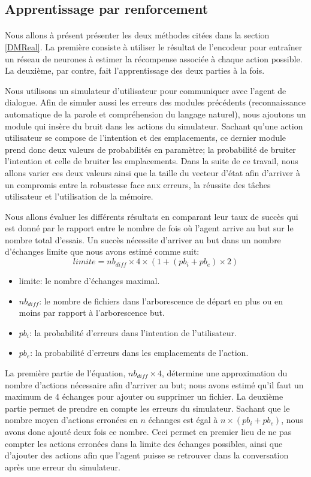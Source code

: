 \subsection{Apprentissage par renforcement}
\paragraph{}Nous allons à présent présenter les deux méthodes citées dans la section \ref{DMReal}. La première consiste à utiliser le résultat de l'encodeur pour entraîner un réseau de neurones à estimer la récompense associée à chaque action possible. La deuxième, par contre, fait l'apprentissage des deux parties à la fois.
\par Nous utilisons un simulateur d'utilisateur pour communiquer avec l'agent de dialogue. Afin de simuler aussi les erreurs des modules précédents (reconnaissance automatique de la parole et compréhension du langage naturel), nous ajoutons un module qui insère du bruit dans les actions du simulateur. Sachant qu'une action utilisateur se compose de l'intention et des emplacements, ce dernier module prend donc deux valeurs de probabilités en paramètre; la probabilité de bruiter l'intention et celle de bruiter les emplacements. Dans la suite de ce travail, nous allons varier ces deux valeurs ainsi que la taille du vecteur d'état afin d'arriver à un compromis entre la robustesse face aux erreurs, la réussite des tâches utilisateur et l'utilisation de la mémoire.
\par Nous allons évaluer les différents résultats en comparant leur taux de succès qui est donné par le rapport entre le nombre de fois où l'agent arrive au but sur le nombre total d'essais. Un succès nécessite d'arriver au but dans un nombre d'échanges limite que nous avons estimé comme suit: 
\[limite = nb_{diff} \times 4 \times (1 + (pb_i + pb_e) \times 2) \]
\begin{itemize}
	\item limite: le nombre d'échanges maximal.
	\item $nb_{diff}$: le nombre de fichiers dans l'arborescence de départ en plus ou en moins par rapport à l'arborescence but.
	\item $pb_i$: la probabilité d'erreurs dans l'intention de l'utilisateur.
	\item $pb_e$: la probabilité d'erreurs dans les emplacements de l'action.
\end{itemize}
\par La première partie de l'équation, $nb_{diff} \times 4$, détermine une approximation du nombre d'actions nécessaire afin d'arriver au but; nous avons estimé qu'il faut un maximum de 4 échanges pour ajouter ou supprimer un fichier. La deuxième partie permet de prendre en compte les erreurs du simulateur. Sachant que le nombre moyen d'actions erronées en $n$ échanges est égal à $n \times (pb_i + pb_e)$, nous avons donc ajouté deux fois ce nombre. Ceci permet en premier lieu de ne pas compter les actions erronées dans la limite des échanges possibles, ainsi que d'ajouter des actions afin que l'agent puisse se retrouver dans la conversation après une erreur du simulateur.
